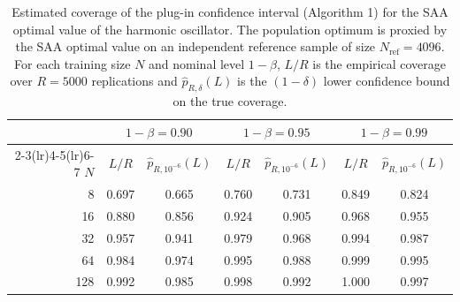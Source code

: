 \begin{table}[t]
  \centering
  \caption{Estimated coverage of the plug-in confidence interval (Algorithm 1) for the SAA optimal value of the harmonic oscillator. The population optimum is proxied by the SAA optimal value on an independent reference sample of size $N_{\mathrm{ref}} = 4096$. For each training size $N$ and nominal level $1-\beta$, $L/R$ is the empirical coverage over $R=5000$ replications and $\widehat p_{R,\delta}(L)$ is the $(1-\delta)$ lower confidence bound on the true coverage.}
  \label{tab:coverage_plugin}
  \begin{tabular}{rcccccc}
    \toprule
     & \multicolumn{2}{c}{$1-\beta = 0.90$} & \multicolumn{2}{c}{$1-\beta = 0.95$} & \multicolumn{2}{c}{$1-\beta = 0.99$} \\
    \cmidrule(lr){2-3}\cmidrule(lr){4-5}\cmidrule(lr){6-7}
    $N$ & $L/R$ & $\widehat{p}_{R,10^{-6}}(L)$ & $L/R$ & $\widehat{p}_{R,10^{-6}}(L)$ & $L/R$ & $\widehat{p}_{R,10^{-6}}(L)$ \\
    \midrule
    8 & 0.697 & 0.665 & 0.760 & 0.731 & 0.849 & 0.824 \\
    16 & 0.880 & 0.856 & 0.924 & 0.905 & 0.968 & 0.955 \\
    32 & 0.957 & 0.941 & 0.979 & 0.968 & 0.994 & 0.987 \\
    64 & 0.984 & 0.974 & 0.995 & 0.988 & 0.999 & 0.995 \\
    128 & 0.992 & 0.985 & 0.998 & 0.992 & 1.000 & 0.997 \\
    \bottomrule
  \end{tabular}
\end{table}
